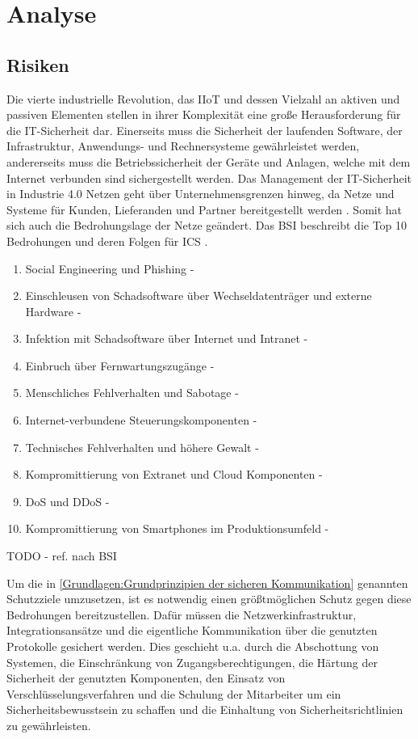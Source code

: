 \chapter{Analyse}

\section{Risiken}
Die vierte industrielle Revolution, das \ac{IIoT} und dessen Vielzahl an aktiven und passiven Elementen stellen in ihrer Komplexität eine große Herausforderung für die IT-Sicherheit dar. Einerseits muss die Sicherheit der laufenden Software, der Infrastruktur, Anwendungs- und Rechnersysteme gewährleistet werden, andererseits muss die Betriebssicherheit der Geräte und Anlagen, welche mit dem Internet verbunden sind sichergestellt werden. Das Management der IT-Sicherheit in Industrie 4.0 Netzen geht über Unternehmensgrenzen hinweg, da Netze und Systeme für Kunden, Lieferanden und Partner bereitgestellt werden \cite{DTAG2016}. Somit hat sich auch die Bedrohungslage der Netze geändert. Das \ac{BSI} beschreibt die Top 10 Bedrohungen und deren Folgen für \ac{ICS} \cite{ICSSec2016}.

\begin{enumerate}
    \item Social Engineering und Phishing - 
    \item Einschleusen von Schadsoftware über Wechseldatenträger und externe Hardware - 
    \item Infektion mit Schadsoftware über Internet und Intranet - 
    \item Einbruch über Fernwartungszugänge - 
    \item Menschliches Fehlverhalten und Sabotage - 
    \item Internet-verbundene Steuerungskomponenten - 
    \item Technisches Fehlverhalten und höhere Gewalt - 
    \item Kompromittierung von Extranet und Cloud Komponenten - 
    \item \ac{DoS} und \ac{DDoS} - 
    \item Kompromittierung von Smartphones im Produktionsumfeld - 
\end{enumerate}

TODO - ref. nach BSI

Um die in \autoref{Grundlagen:Grundprinzipien der sicheren Kommunikation} genannten Schutzziele umzusetzen, ist es notwendig einen größtmöglichen Schutz gegen diese Bedrohungen bereitzustellen. Dafür müssen die Netzwerkinfrastruktur, Integrationsansätze und die eigentliche Kommunikation über die genutzten Protokolle gesichert werden. Dies geschieht u.a. durch die Abschottung von Systemen, die Einschränkung von Zugangsberechtigungen, die Härtung der Sicherheit der genutzten Komponenten, den Einsatz von Verschlüsselungsverfahren und die Schulung der Mitarbeiter um ein Sicherheitsbewusstsein zu schaffen und die Einhaltung von Sicherheitsrichtlinien zu gewährleisten.

